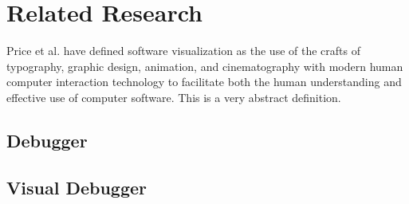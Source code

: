 \chapter {Related Research}

Price et al. \cite{Price1993211} have defined software visualization as the use of the crafts of typography, graphic design, animation, and cinematography with modern human computer interaction technology to facilitate both the human understanding and effective use of computer software. This is a very abstract definition. 

\section {Debugger}

\section {Visual Debugger}